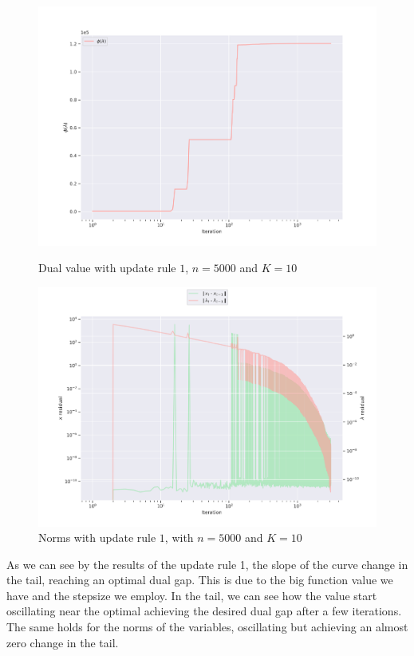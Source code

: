\documentclass[notitlepage]{article}
\begin{document}
\begin{figure}[H]
  \begin{minipage}{0.49\textwidth}
    \centering
    \includegraphics[scale=0.33]{pics/n=5000_K=10_dual_rule=1.png}
    \caption{Dual value with update rule $1$, $n=5000$ and $K=10$}
    \label{fig:rule-1-n-5000-k-10-dual}
  \end{minipage}
  \begin{minipage}{0.49\textwidth}
    \centering
    \includegraphics[scale=0.33]{pics/n=5000_K=10_lambda_rule=1.png}
    \caption{Norms with update rule $1$, with $n=5000$ and $K=10$}
    \label{fig:rule-1-n-5000-k-10-norm}
  \end{minipage}  
\end{figure}

\begin{changemargin}{3.5cm}{3.5cm}
  As we can see by the results of the update rule 1, the slope of the curve change in the tail, reaching an optimal dual gap. This is due to the big function value we have 
  and the stepsize we employ. In the tail, we can see how the value start oscillating near the optimal achieving the desired dual gap after a few iterations.\\
  The same holds for the norms of the variables, oscillating but achieving an almost zero change in the tail.
\end{changemargin}
\end{document}
